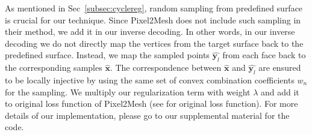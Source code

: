 As mentioned in Sec~\ref{subsec:cyclereg}, random sampling from predefined surface is crucial for our technique. Since Pixel2Mesh does not include such sampling in their method, we add it in our inverse decoding. In other words, in our inverse decoding we do not directly map the vertices from the target surface back to the predefined surface. Instead, we map the sampled points $\hat{\mathbf{y}_l}$ from each face back to the corresponding samples $\hat{\mathbf{x}}$. The correspondence between $\hat{\mathbf{x}}$ and $\hat{\mathbf{y}_l}$ are ensured to be locally injective by using the same set of convex combination coefficients $w_n$ for the sampling. We multiply our regularization term with weight $\lambda$ and add it to original loss function of Pixel2Mesh (see \cite{pixel2mesh} for original loss function). For more details of our implementation, please go to our supplemental material for the code.
